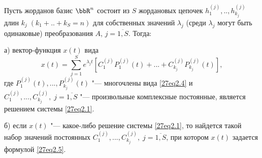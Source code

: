 \begin{thm}\label{27thm2}
Пусть жорданов базис $\bbR^n$ состоит из $S$ жордановых цепочек $h_1^{(j)},..,h_{k_j}^{(j)}$ длин $k_j\; (k_1+..+k_S=n)$ для собственных значений $\lambda_j$ (среди $\lambda_j$ могут быть одинаковые) преобразования $A$, $j=\overline{1,S}$. Тогда:

а) вектор-функция $x(t)$ вида
\begin{equation}\label{27eq2.5}
x(t)=\sum\limits_{j=1}^S e^{\lambda_j t}\left[C_1^{(j)}P_1^{(j)}(t)+...+C_{k_j}^{(j)}P_{k_j}^{(j)}(t)\right],
\end{equation}
где $P_1^{(j)}(t),...,P_{k_j}^{(j)}(t)$ "--- многочлены вида \eqref{27eq2.4} и $C_1^{(j)},...,C_{k_j}^{(j)},\; j=\overline{1,S}$ "--- произвольные комплексные постоянные, является решением системы \eqref{27eq2.1}.

б) если $x(t)$ "--- какое-либо решение системы \eqref{27eq2.1}, то найдется такой набор значений постоянных $C_1^{(j)},...,C_{k_j}^{(j)},\; j=\overline{1,S}$, при котором $x(t)$ задается формулой \eqref{27eq2.5}.
\end{thm}

